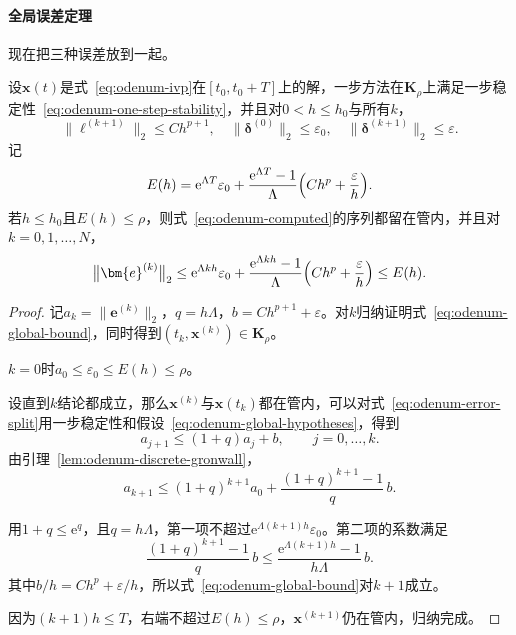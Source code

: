 \paragraph{全局误差定理}
现在把三种误差放到一起。

\begin{theorem}[有限区间上的全局误差界]
 \label{thm:odenum-global-error}
 设$\bm{x}(t)$是式~\eqref{eq:odenum-ivp}在$[t_0,t_0+T]$上的解，一步方法在$\bm{K}_{\rho}$上满足一步稳定性~\eqref{eq:odenum-one-step-stability}，并且对$0<h\leq h_0$与所有$k$，
 \begin{equation}
  \bigl\lVert\bm{\ell}^{(k+1)}\bigr\rVert_2\leq Ch^{p+1},\quad
  \bigl\lVert\bm{\delta}^{(0)}\bigr\rVert_2\leq\varepsilon_0,\quad
  \bigl\lVert\bm{\delta}^{(k+1)}\bigr\rVert_2\leq\varepsilon.
  \label{eq:odenum-global-hypotheses}
 \end{equation}
 记
 \begin{equation}
  E(h)=\mathrm{e}^{\Lambda T}\varepsilon_0+\frac{\mathrm{e}^{\Lambda T}-1}{\Lambda}\Bigl(Ch^{p}+\frac{\varepsilon}{h}\Bigr).
  \label{eq:odenum-global-bound-def}
 \end{equation}
 若$h\leq h_0$且$E(h)\leq\rho$，则式~\eqref{eq:odenum-computed}的序列都留在管内，并且对$k=0,1,\ldots,N$，
 \begin{equation}
  \bigl\lVert\bm{e}^{(k)}\bigr\rVert_2\leq\mathrm{e}^{\Lambda kh}\varepsilon_0+\frac{\mathrm{e}^{\Lambda kh}-1}{\Lambda}\Bigl(Ch^{p}+\frac{\varepsilon}{h}\Bigr)\leq E(h).
  \label{eq:odenum-global-bound}
 \end{equation}
\end{theorem}

\begin{proof}
 记$a_k=\lVert\bm{e}^{(k)}\rVert_2$，$q=h\Lambda$，$b=Ch^{p+1}+\varepsilon$。对$k$归纳证明式~\eqref{eq:odenum-global-bound}，同时得到$(t_k,\bm{x}^{(k)})\in\bm{K}_{\rho}$。

 $k=0$时$a_0\leq\varepsilon_0\leq E(h)\leq\rho$。

 设直到$k$结论都成立，那么$\bm{x}^{(k)}$与$\bm{x}(t_k)$都在管内，可以对式~\eqref{eq:odenum-error-split}用一步稳定性和假设~\eqref{eq:odenum-global-hypotheses}，得到
 \[
  a_{j+1}\leq(1+q)a_j+b,\qquad j=0,\ldots,k.
 \]
 由引理~\ref{lem:odenum-discrete-gronwall}，
 \[
  a_{k+1}\leq(1+q)^{k+1}a_0+\frac{(1+q)^{k+1}-1}{q}\,b.
 \]

 用$1+q\leq\mathrm{e}^{q}$，且$q=h\Lambda$，第一项不超过$\mathrm{e}^{\Lambda(k+1)h}\varepsilon_0$。第二项的系数满足
 \[
  \frac{(1+q)^{k+1}-1}{q}\,b\leq\frac{\mathrm{e}^{\Lambda(k+1)h}-1}{h\Lambda}\,b.
 \]
 其中$b/h=Ch^{p}+\varepsilon/h$，所以式~\eqref{eq:odenum-global-bound}对$k+1$成立。

 因为$(k+1)h\leq T$，右端不超过$E(h)\leq\rho$，$\bm{x}^{(k+1)}$仍在管内，归纳完成。
\end{proof}

